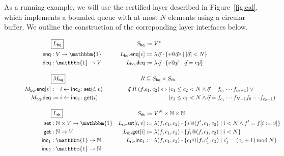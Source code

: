 \documentclass[11pt,oneside,draft]{book}
\theoremstyle{definition}
\newcommand{\kw}[1]{\ensuremath{ \mathsf{#1} }}
\newcommand{\bdot}{\boldsymbol{\cdot}}
\begin{document}
As a running example,
we will use the certified layer
described in Figure~\ref{fig:cal},
which implements a bounded queue with at most $N$ elements
using a circular buffer.
We outline the construction of
the correponding layer interfaces below.

\begin{figure} %
  \small
    \begin{align*}
      & \fbox{$L_\kw{bq}$} &
        S_\kw{bq} &:= V^* \\
      \kw{enq} &: V \rightarrow \mathbbm{1} &
        L_\kw{bq}.\kw{enq}[v] &:=
          \lambda \, \vec{q} \bdot \{ * @ \vec{q} v \mid |\vec{q}| < N \} \\
      \kw{deq} &: \mathbbm{1} \rightarrow V &
        L_\kw{bq}.\kw{deq} &:=
          \lambda \, \vec{q} \bdot \{ v @ \vec{p} \: \mid \vec{q} = v \vec{p} \}
      \\[1em]
      & \fbox{$M_\kw{bq}$} &
        R &\subseteq S_\kw{bq} \times S_\kw{rb} \\
      M_\kw{bq}.\kw{enq}[v] &:= i \leftarrow \kw{inc}_2 ; \: \kw{set}(i, v) \!\!\!\! &
        \vec{q} \mathrel{R} (f, &c_1, c_2) \Leftrightarrow
           (c_1 \le c_2 < N \wedge
            \vec{q} = f_{c_1} \cdots f_{c_2-1}) \vee {}
      \\
      M_\kw{bq}.\kw{deq} &:= i \leftarrow \kw{inc}_1 ; \: \kw{get}(i) &
           &\phantom{c_1, c_2) \Leftrightarrow {}}
           (c_2 \le c_1 < N \wedge
            \vec{q} = f_{c_1} \cdots f_{N-1} f_0 \cdots f_{c_2 - 1})
      \\[1em]
      & \fbox{$L_\kw{rb}$} &
        S_\kw{rb} &:= V^N \times \mathbb{N} \times \mathbb{N}
      \\
      \kw{set} &: \mathbb{N} \times V \rightarrow \mathbbm{1} &
        L_\kw{rb}.\kw{set}[i, v] &:=
          \lambda (f, c_1, c_2) \bdot
          \{ *@(f', c_1, c_2) \mid i < N \wedge f' = f[i := v] \}
      \\
      \kw{get} &: \mathbb{N} \rightarrow V &
        L_\kw{rb}.\kw{get}[i] &:=
          \lambda (f, c_1, c_2) \bdot
          \{ f_i@(f, c_1, c_2) \mid i < N \}
      \\
      \kw{inc}_1 &: \mathbbm{1} \rightarrow \mathbb{N} &
        L_\kw{rb}.\kw{inc}_1 &:=
          \lambda (f, c_1, c_2) \bdot
          \{ c_1@(f, c_1', c_2) \mid
             c_1' = (c_1 + 1) \mathbin{\mathrm{mod}} N \}
      \\
      \kw{inc}_2 &: \mathbbm{1} \rightarrow \mathbb{N} &

\end{align*}
\end{figure}
\end{document}
